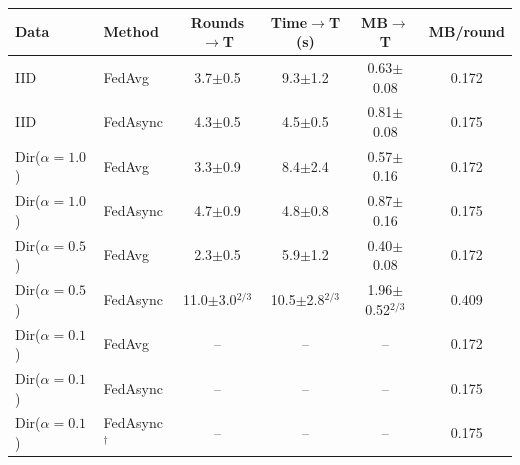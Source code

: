 \begin{tabular}{llcccc}
\toprule
Data & Method & Rounds$\to$T & Time$\to$T (s) & MB$\to$T & MB/round \\
\midrule
IID & FedAvg & 3.7$\pm$0.5 & 9.3$\pm$1.2 & 0.63$\pm$0.08 & 0.172 \\
IID & FedAsync & 4.3$\pm$0.5 & 4.5$\pm$0.5 & 0.81$\pm$0.08 & 0.175 \\
\midrule
Dir($\alpha{=}1.0$) & FedAvg & 3.3$\pm$0.9 & 8.4$\pm$2.4 & 0.57$\pm$0.16 & 0.172 \\
Dir($\alpha{=}1.0$) & FedAsync & 4.7$\pm$0.9 & 4.8$\pm$0.8 & 0.87$\pm$0.16 & 0.175 \\
\midrule
Dir($\alpha{=}0.5$) & FedAvg & 2.3$\pm$0.5 & 5.9$\pm$1.2 & 0.40$\pm$0.08 & 0.172 \\
Dir($\alpha{=}0.5$) & FedAsync & 11.0$\pm$3.0$^{2/3}$ & 10.5$\pm$2.8$^{2/3}$ & 1.96$\pm$0.52$^{2/3}$ & 0.409 \\
\midrule
Dir($\alpha{=}0.1$) & FedAvg & -- & -- & -- & 0.172 \\
Dir($\alpha{=}0.1$) & FedAsync & -- & -- & -- & 0.175 \\
Dir($\alpha{=}0.1$) & FedAsync$^\dagger$ & -- & -- & -- & 0.175 \\
\bottomrule
\end{tabular}

